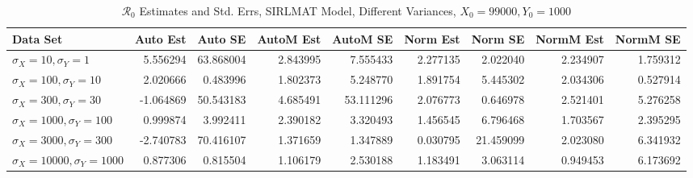 \documentclass[12pt]{article}
\newcommand{\rr}{\ensuremath{\mathcal{R}_0}}
\begin{document}
\begin{table}[H]
	
	\caption{$\rr$ Estimates and Std. Errs, SIRLMAT Model,
		Different Variances, 
		$X_0 = 99000, Y_0 = 1000$}
	\begin{footnotesize}
		\hskip -1.7cm
		\begin{tabular}{l|r|r|r|r|r|r|r|r}
			\hline
			Data Set & Auto Est & Auto SE & AutoM Est & AutoM SE & Norm Est & Norm SE & NormM Est & NormM SE\\
			\hline
			$\sigma_X = 10, \sigma_Y = 1$ & 5.556294 & 63.868004 & 2.843995 & 7.555433 & 2.277135 & 2.022040 & 2.234907 & 1.759312\\
			\hline
			$\sigma_X = 100, \sigma_Y = 10$ & 2.020666 & 0.483996 & 1.802373 & 5.248770 & 1.891754 & 5.445302 & 2.034306 & 0.527914\\
			\hline
			$\sigma_X = 300, \sigma_Y = 30$ & -1.064869 & 50.543183 & 4.685491 & 53.111296 & 2.076773 & 0.646978 & 2.521401 & 5.276258\\
			\hline
			$\sigma_X = 1000, \sigma_Y = 100$ & 0.999874 & 3.992411 & 2.390182 & 3.320493 & 1.456545 & 6.796468 & 1.703567 & 2.395295\\
			\hline
			$\sigma_X = 3000, \sigma_Y = 300$ & -2.740783 & 70.416107 & 1.371659 & 1.347889 & 0.030795 & 21.459099 & 2.023080 & 6.341932\\
			\hline
			$\sigma_X = 10000, \sigma_Y = 1000$ & 0.877306 & 0.815504 & 1.106179 & 2.530188 & 1.183491 & 3.063114 & 0.949453 & 6.173692\\
			\hline
		\end{tabular}
	\end{footnotesize}
\end{table}
\end{document}
